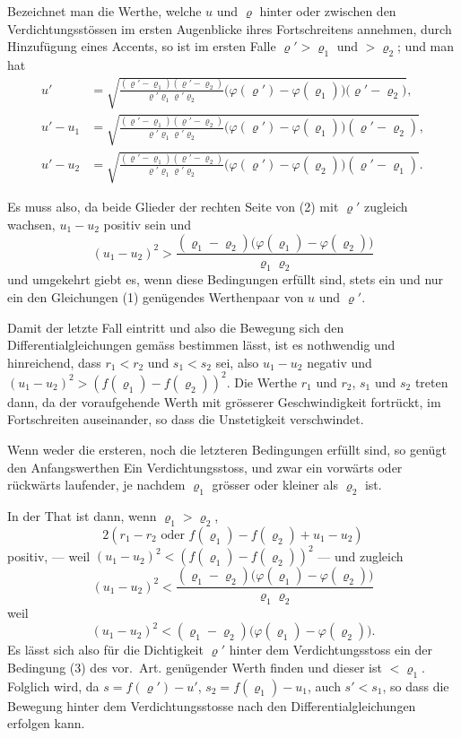 \documentclass[12pt,a4paper]{book}
\theoremstyle{definition}
\theoremstyle{remark}
\begin{document}
Bezeichnet man die Werthe, welche $u$ und $\varrho$ hinter oder zwischen den Verdichtungsst\"ossen im ersten Augenblicke ihres Fortschreitens annehmen, durch Hinzuf\"ugung eines Accents, so ist im ersten Falle $\varrho' > \varrho_{1}$ und $> \varrho_{2}$; und man hat
\begin{align*}
u' &= \sqrt{\frac{(\varrho' - \varrho_{1})(\varrho' - \varrho_{2})}{\varrho'\varrho_{1}\varrho'\varrho_{2}}\bigl(\varphi(\varrho') - \varphi(\varrho_{1})\bigr)\bigl(\varrho' - \varrho_{2}\bigr)},\tag{1}\\
u' - u_{1} &= \sqrt{\frac{(\varrho' - \varrho_{1})(\varrho' - \varrho_{2})}{\varrho'\varrho_{1}\varrho'\varrho_{2}}\bigl(\varphi(\varrho') - \varphi(\varrho_{1})\bigr)(\varrho' - \varrho_{2})},\\
u' - u_{2} &= \sqrt{\frac{(\varrho' - \varrho_{1})(\varrho' - \varrho_{2})}{\varrho'\varrho_{1}\varrho'\varrho_{2}}\bigl(\varphi(\varrho') - \varphi(\varrho_{2})\bigr)(\varrho' - \varrho_{1})}.\tag{2}
\end{align*}

Es muss also, da beide Glieder der rechten Seite von (2) mit $\varrho'$ zugleich wachsen, $u_{1} - u_{2}$ positiv sein und
\[
(u_{1} - u_{2})^{2} > \frac{(\varrho_{1} - \varrho_{2})\bigl(\varphi(\varrho_{1}) - \varphi(\varrho_{2})\bigr)}{\varrho_{1}\varrho_{2}}
\]
und umgekehrt giebt es, wenn diese Bedingungen erf\"ullt sind, stets ein und nur ein den Gleichungen (1) gen\"ugendes Werthenpaar von $u$ und $\varrho'$.

Damit der letzte Fall eintritt und also die Bewegung sich den Differentialgleichungen gem\"ass bestimmen l\"asst, ist es nothwendig und hinreichend, dass $r_{1} < r_{2}$ und $s_{1} < s_{2}$ sei, also $u_{1} - u_{2}$ negativ und $(u_{1} - u_{2})^{2} > (f(\varrho_{1}) - f(\varrho_{2}))^{2}$. Die Werthe $r_{1}$ und $r_{2}$, $s_{1}$ und $s_{2}$ treten dann, da der voraufgehende Werth mit gr\"osserer Geschwindigkeit fortr\"uckt, im Fortschreiten auseinander, so dass die Unstetigkeit verschwindet.

Wenn weder die ersteren, noch die letzteren Bedingungen erf\"ullt sind, so gen\"ugt den Anfangswerthen Ein Verdichtungsstoss, und zwar ein vorw\"arts oder r\"uckw\"arts laufender, je nachdem $\varrho_{1}$ gr\"osser oder kleiner als $\varrho_{2}$ ist.

In der That ist dann, wenn $\varrho_{1} > \varrho_{2}$,
\[
2(r_{1} - r_{2}\text{ oder }f(\varrho_{1}) - f(\varrho_{2}) + u_{1} - u_{2})
\]
positiv, --- weil $(u_{1} - u_{2})^{2} < (f(\varrho_{1}) - f(\varrho_{2}))^{2}$ --- und zugleich
\[
(u_{1} - u_{2})^{2} < \frac{(\varrho_{1} - \varrho_{2})\bigl(\varphi(\varrho_{1}) - \varphi(\varrho_{2})\bigr)}{\varrho_{1}\varrho_{2}}
\]
weil
\[
(u_{1} - u_{2})^{2} < (\varrho_{1} - \varrho_{2})\bigl(\varphi(\varrho_{1}) - \varphi(\varrho_{2})\bigr).
\]
Es l\"asst sich also f\"ur die Dichtigkeit $\varrho'$ hinter dem Verdichtungsstoss ein der Bedingung (3) des vor.~Art. gen\"ugender Werth finden und dieser ist $< \varrho_{1}$. Folglich wird, da $s = f(\varrho') - u'$, $s_{2} = f(\varrho_{1}) - u_{1}$, auch $s' < s_{1}$, so dass die Bewegung hinter dem Verdichtungsstosse nach den Differentialgleichungen erfolgen kann.
\end{document}
